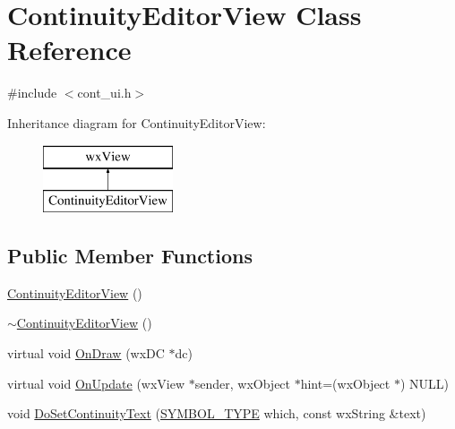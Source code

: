 \hypertarget{a00060}{\section{Continuity\-Editor\-View Class Reference}
\label{a00060}
}


{\ttfamily \#include $<$cont\-\_\-ui.\-h$>$}

Inheritance diagram for Continuity\-Editor\-View\-:\begin{figure}[H]
\begin{center}
\leavevmode
\includegraphics[height=2.000000cm]{a00060}
\end{center}
\end{figure}
\subsection*{Public Member Functions}
\begin{DoxyCompactItemize}
\item 
\hyperlink{a00060_a6c18f0bddca95ed60d18cea193d949d0}{Continuity\-Editor\-View} ()
\item 
\hyperlink{a00060_a18f4efb58a588aba9bafc57b376251ce}{$\sim$\-Continuity\-Editor\-View} ()
\item 
virtual void \hyperlink{a00060_addac4ca19641c7e984761b4f8028a8d9}{On\-Draw} (wx\-D\-C $\ast$dc)
\item 
virtual void \hyperlink{a00060_a82c91de0bdb32c27239170ad0c997cbd}{On\-Update} (wx\-View $\ast$sender, wx\-Object $\ast$hint=(wx\-Object $\ast$) N\-U\-L\-L)
\item 
void \hyperlink{a00060_a51db98325d30c848e1a3ec321ff2a578}{Do\-Set\-Continuity\-Text} (\hyperlink{a00216_a68cd84e0300be6f9ff4474682762c9ee}{S\-Y\-M\-B\-O\-L\-\_\-\-T\-Y\-P\-E} which, const wx\-String \&text)
\end{DoxyCompactItemize}


